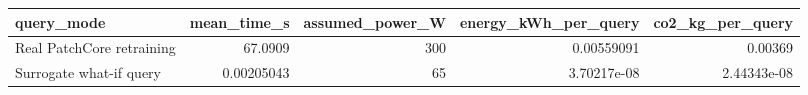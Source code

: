 \begin{tabular}{lrrrr}
\toprule
               query\_mode &  mean\_time\_s &  assumed\_power\_W &  energy\_kWh\_per\_query &  co2\_kg\_per\_query \\
\midrule
Real PatchCore retraining &      67.0909 &              300 &            0.00559091 &           0.00369 \\
  Surrogate what-if query &   0.00205043 &               65 &           3.70217e-08 &       2.44343e-08 \\
\bottomrule
\end{tabular}
